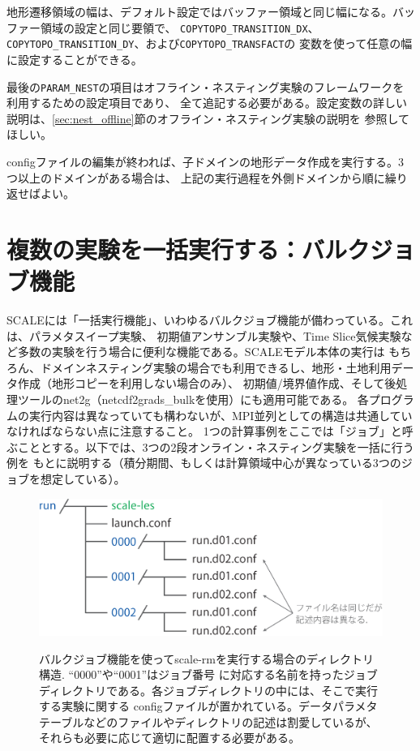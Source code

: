 地形遷移領域の幅は、デフォルト設定ではバッファー領域と同じ幅になる。バッファー領域の設定と同じ要領で、
\verb|COPYTOPO_TRANSITION_DX|、\verb|COPYTOPO_TRANSITION_DY|、および\verb|COPYTOPO_TRANSFACT|の
変数を使って任意の幅に設定することができる。

最後の\verb|PARAM_NEST|の項目はオフライン・ネスティング実験のフレームワークを利用するための設定項目であり、
全て追記する必要がある。設定変数の詳しい説明は、\ref{sec:nest_offline}節のオフライン・ネスティング実験の説明を
参照してほしい。

configファイルの編集が終われば、子ドメインの地形データ作成を実行する。3つ以上のドメインがある場合は、
上記の実行過程を外側ドメインから順に繰り返せばよい。



\section{複数の実験を一括実行する：バルクジョブ機能} \label{sec:bulkjob}

SCALEには「一括実行機能」、いわゆるバルクジョブ機能が備わっている。これは、パラメタスイープ実験、
初期値アンサンブル実験や、Time Slice気候実験など多数の実験を行う場合に便利な機能である。SCALEモデル本体の実行は
もちろん、ドメインネスティング実験の場合でも利用できるし、地形・土地利用データ作成（地形コピーを利用しない場合のみ）、
初期値/境界値作成、そして後処理ツールのnet2g（netcdf2grads\_bulkを使用）にも適用可能である。
各プログラムの実行内容は異なっていても構わないが、MPI並列としての構造は共通していなければならない点に注意すること。
1つの計算事例をここでは「ジョブ」と呼ぶこととする。以下では、3つの2段オンライン・ネスティング実験を一括に行う例を
もとに説明する（積分期間、もしくは計算領域中心が異なっている3つのジョブを想定している）。


\begin{figure}[t]
\begin{center}
  \includegraphics[width=0.6\hsize]{./figure/bulkjob_directory_structure.eps}\\
  \caption{バルクジョブ機能を使ってscale-rmを実行する場合のディレクトリ構造. ``0000''や``0001''はジョブ番号
           に対応する名前を持ったジョブディレクトリである。各ジョブディレクトリの中には、そこで実行する実験に関する
           configファイルが置かれている。データパラメタテーブルなどのファイルやディレクトリの記述は割愛しているが、
           それらも必要に応じて適切に配置する必要がある。}
  \label{fig_bulkjob}
\end{center}
\end{figure}


